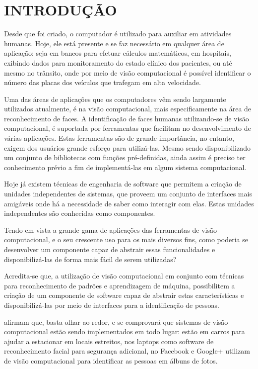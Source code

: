 \chapter{INTRODUÇÃO}
\label{chp:intro}

Desde que foi criado, o computador é utilizado para auxiliar em atividades humanas. Hoje, ele está presente e se faz necessário em qualquer área de aplicação: seja em bancos para efetuar cálculos matemáticos, em hospitais, exibindo dados para monitoramento do estado clínico dos pacientes, ou até mesmo no trânsito, onde por meio de visão computacional é possível identificar o número das placas dos veículos que trafegam em alta velocidade.

Uma das áreas de aplicações que os computadores vêm sendo largamente utilizados atualmente, é na visão computacional, mais especificamente na área de reconhecimento de faces. A identificação de faces humanas utilizando-se de visão computacional, é suportada por ferramentas que facilitam no desenvolvimento de várias aplicações. Estas ferramentas são de grande importância, no entanto, exigem dos usuários grande esforço para utilizá-las. Mesmo sendo disponibilizado um conjunto de bibliotecas com funções pré-definidas, ainda assim é preciso ter conhecimento prévio a fim de implementá-las em algum sistema computacional.

Hoje já existem técnicas de engenharia de software que permitem a criação de unidades independentes de sistemas, que proveem um conjunto de interfaces mais amigáveis onde há a necessidade de saber como interagir com elas. Estas unidades independentes são conhecidas como componentes. 

Tendo em vista a grande gama de aplicações das ferramentas de visão computacional, e o seu crescente uso para os mais diversos fins, como poderia se desenvolver um componente capaz de abstrair essas funcionalidades e disponibilizá-las de forma mais fácil de serem utilizadas?

Acredita-se que, a utilização de visão computacional em conjunto com técnicas para reconhecimento de padrões e aprendizagem de máquina, possibilitem a criação de um componente de software capaz de abstrair estas características e disponibilizá-las por meio de interfaces para a identificação de pessoas.

\cite{LiJain2011} afirmam que, basta olhar ao redor, e se comprovará que sistemas de visão computacional estão sendo implementados em todo lugar: estão em carros para ajudar a estacionar em locais estreitos, nos laptops como software de reconhecimento facial para segurança adicional, no Facebook e Google+ utilizam de visão computacional para identificar as pessoas em álbuns de fotos.

